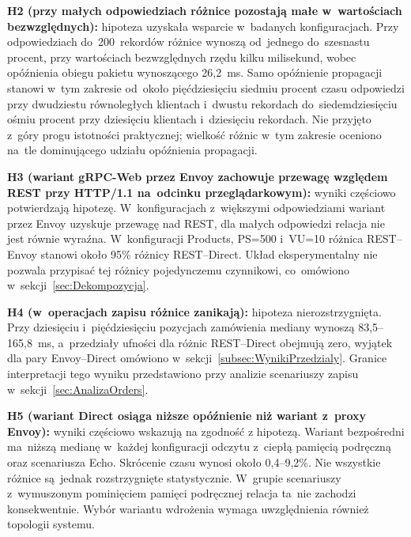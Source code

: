 \begin{sloppypar}
\textbf{H2 (przy małych odpowiedziach różnice pozostają małe w~wartościach bezwzględnych):} hipoteza uzyskała wsparcie w~badanych konfiguracjach. Przy odpowiedziach do~200~rekordów różnice wynoszą od~jednego do~szesnastu procent, przy wartościach bezwzględnych rzędu kilku milisekund, wobec opóźnienia obiegu pakietu wynoszącego 26,2~ms. Samo opóźnienie propagacji stanowi w~tym zakresie od~około pięćdziesięciu
siedmiu procent czasu odpowiedzi przy dwudziestu równoległych klientach
i~dwustu rekordach do~siedemdziesięciu ośmiu procent przy dziesięciu
klientach i~dziesięciu rekordach. Nie przyjęto z~góry progu istotności praktycznej; wielkość różnic w~tym zakresie oceniono na~tle dominującego udziału opóźnienia propagacji.
\end{sloppypar}

\begin{sloppypar}
\textbf{H3 (wariant gRPC-Web przez Envoy zachowuje przewagę względem REST przy HTTP/1.1 na~odcinku przeglądarkowym):} wyniki częściowo potwierdzają hipotezę. W~konfiguracjach z~większymi odpowiedziami wariant przez Envoy uzyskuje przewagę nad REST, dla małych odpowiedzi relacja nie jest równie wyraźna. W~konfiguracji Products, PS=500 i~VU=10 różnica REST--Envoy stanowi około 95\% różnicy REST--Direct. Układ eksperymentalny nie pozwala przypisać tej różnicy pojedynczemu czynnikowi, co~omówiono w~sekcji~\ref{sec:Dekompozycja}.
\end{sloppypar}

\begin{sloppypar}
\textbf{H4 (w~operacjach zapisu różnice zanikają):} hipoteza nierozstrzygnięta. Przy dziesięciu i~pięćdziesięciu pozycjach zamówienia mediany wynoszą 83,5--165,8~ms, a~przedziały ufności dla różnic REST--Direct obejmują zero, wyjątek dla pary Envoy--Direct omówiono w~sekcji~\ref{subsec:WynikiPrzedzialy}. Granice interpretacji tego wyniku przedstawiono przy analizie scenariuszy zapisu w~sekcji~\ref{sec:AnalizaOrders}.
\end{sloppypar}

\textbf{H5 (wariant Direct osiąga niższe opóźnienie niż wariant z~proxy Envoy):} wyniki częściowo wskazują na zgodność z hipotezą. Wariant bezpośredni ma~niższą medianę w~każdej konfiguracji odczytu z~ciepłą pamięcią podręczną oraz scenariusza Echo. Skrócenie czasu wynosi około 0,4--9,2\%. Nie wszystkie różnice są~jednak rozstrzygnięte statystycznie. W~grupie scenariuszy z~wymuszonym pominięciem pamięci podręcznej relacja ta~nie zachodzi konsekwentnie. Wybór wariantu wdrożenia wymaga uwzględnienia również topologii systemu.

